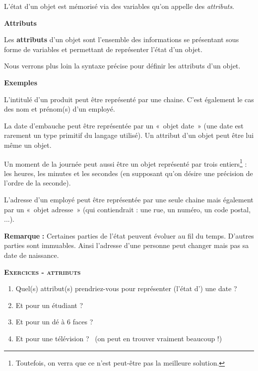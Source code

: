 L'état d'un objet est mémorisé via des
variables qu'on appelle des \textit{attributs}.

\bigskip

{\sffamily\bfseries\upshape
Attributs}

Les \textbf{attributs} d'un objet sont
l'ensemble des informations se présentant sous forme
de variables et permettant de représenter l'état
d'un objet.

Nous verrons plus loin la syntaxe précise pour définir les attributs
d'un objet.

{
\textbf{Exemples} }

\begin{liste}
	\item 
		L'intitulé d'un produit peut être
		représenté par une chaine. C'est également le cas des
		nom et prénom(s) d'un employé.
	\item 
		La date d'embauche peut être représentée par un «~objet
		date~» (une date est rarement un type primitif du langage utilisé). Un
		attribut d'un objet peut être lui même un objet.
	\item 
		Un moment de la journée peut aussi être un objet représenté par trois
		entiers\footnote{Toutefois, on verra que ce n'est
		peut-être pas la meilleure solution.} : les heures, les minutes et les
		secondes (en supposant qu'on désire une précision de
		l'ordre de la seconde).
	\item 
		L'adresse d'un employé peut être
		représentée par une seule chaine mais également par un «~objet
		adresse~» (qui contiendrait : une rue, un numéro, un code postal,
		...).
\end{liste}

{\textbf{Remarque}\textbf{ : }Certaines parties de
l'état peuvent évoluer au fil du temps.
D'autres parties sont immuables. Ainsi
l'adresse d'une personne peut changer
mais pas sa date de naissance. }

\clearpage
{}
{\sffamily\bfseries\scshape
Exercices - attributs}

\begin{enumerate}
	\item 
		Quel(s) attribut(s) prendriez-vous pour représenter
		(l'état d') une date ?
	\item 
		Et pour un étudiant ?
	\item 
		Et pour un dé à 6 faces ?
	\item 
		Et pour une télévision ? \ (on peut en trouver vraiment beaucoup !)
\end{enumerate}


